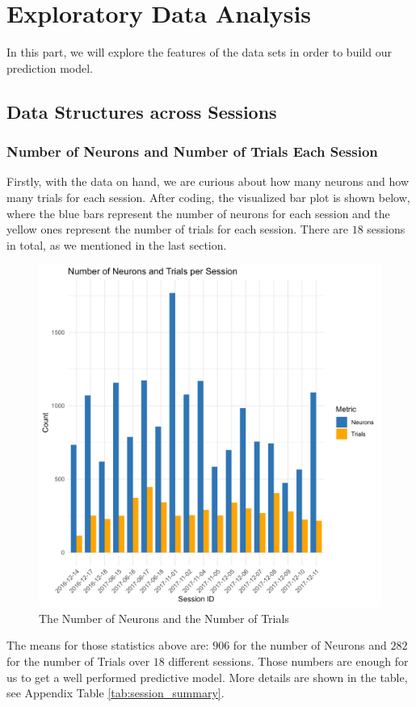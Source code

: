 \documentclass{article}
\begin{document}
	\section{Exploratory Data Analysis}
	\par In this part, we will explore the features of the data sets in order to build our prediction model. 
	\subsection{Data Structures across Sessions}
	\subsubsection{Number of Neurons and Number of Trials Each Session}
	\par Firstly, with the data on hand, we are curious about how many neurons and how many trials for each session. After coding, the visualized bar plot is shown below, where the blue bars represent the number of neurons for each session and the yellow ones represent the number of trials for each session. There are $18$ sessions in total, as we mentioned in the last section.
	\begin{figure}[htbp]
		\centering
		\includegraphics[scale = 0.5]{Pics/004}
		\caption{The Number of Neurons and the Number of Trials}
		\label{fig:004}
	\end{figure}
	\par The means for those statistics above are: $906$ for the number of Neurons and $282$ for the number of Trials over $18$ different sessions. Those numbers are enough for us to get a well performed predictive model. More details are shown in the table, see Appendix Table \ref{tab:session_summary}.
	\clearpage
\end{document}
